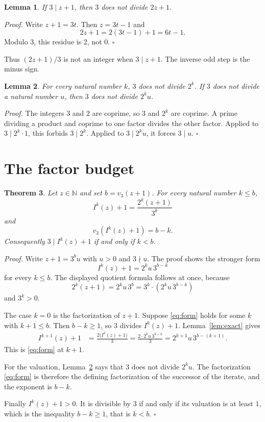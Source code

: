 \documentclass[11pt,letterpaper]{article}
\newcommand{\N}{\mathbb{N}}
\newtheorem{theorem}{Theorem}
\newtheorem{lemma}[theorem]{Lemma}
\newenvironment{proof}{\noindent\textit{Proof.}}{\hfill\(\square\)}
\begin{document}
\begin{lemma}
\label{lem:plus}
If \(3\mid z+1\), then \(3\) does not divide \(2z+1\).
\end{lemma}

\begin{proof}
Write \(z+1=3t\). Then \(z=3t-1\) and
\[
2z+1=2(3t-1)+1=6t-1.
\]
Modulo \(3\), this residue is \(2\), not \(0\).
\end{proof}

Thus \((2z+1)/3\) is not an integer when \(3\mid z+1\). The inverse odd step is the minus sign.

\begin{lemma}
\label{lem:two}
For every natural number \(k\), \(3\) does not divide \(2^k\). If \(3\) does not divide a natural number \(u\), then \(3\) does not divide \(2^ku\).
\end{lemma}

\begin{proof}
The integers \(3\) and \(2\) are coprime, so \(3\) and \(2^k\) are coprime. A prime dividing a product and coprime to one factor divides the other factor. Applied to \(3\mid 2^k\cdot 1\), this forbids \(3\mid 2^k\). Applied to \(3\mid 2^ku\), it forces \(3\mid u\).
\end{proof}

\section{The factor budget}

\begin{theorem}
\label{thm:budget}
Let \(z\in\N\) and set \(b=v_3(z+1)\). For every natural number \(k\le b\),
\[
I^k(z)+1=\frac{2^k(z+1)}{3^k}
\]
and
\[
v_3(I^k(z)+1)=b-k.
\]
Consequently \(3\mid I^k(z)+1\) if and only if \(k<b\).
\end{theorem}

\begin{proof}
Write \(z+1=3^bu\) with \(u>0\) and \(3\nmid u\). The proof shows the stronger form
\begin{equation}
\label{eq:form}
I^k(z)+1=2^ku\,3^{b-k}
\end{equation}
for every \(k\le b\). The displayed quotient formula follows at once, because
\[
2^k(z+1)=2^ku\,3^b=3^k\cdot(2^ku\,3^{b-k})
\]
and \(3^k>0\).

The case \(k=0\) is the factorization of \(z+1\). Suppose \eqref{eq:form} holds for some \(k\) with \(k+1\le b\). Then \(b-k\ge 1\), so \(3\) divides \(I^k(z)+1\). Lemma~\ref{lem:exact} gives
\begin{align*}
I^{k+1}(z)+1
&=\frac{2\bigl(I^k(z)+1\bigr)}{3}
=\frac{2\cdot 2^ku\,3^{b-k}}{3}
=2^{k+1}u\,3^{b-(k+1)}.
\end{align*}
This is \eqref{eq:form} at \(k+1\).

For the valuation, Lemma~\ref{lem:two} says that \(3\) does not divide \(2^ku\). The factorization \eqref{eq:form} is therefore the defining factorization of the successor of the iterate, and the exponent is \(b-k\).

Finally \(I^k(z)+1>0\). It is divisible by \(3\) if and only if its valuation is at least \(1\), which is the inequality \(b-k\ge 1\), that is \(k<b\).
\end{proof}
\end{document}
